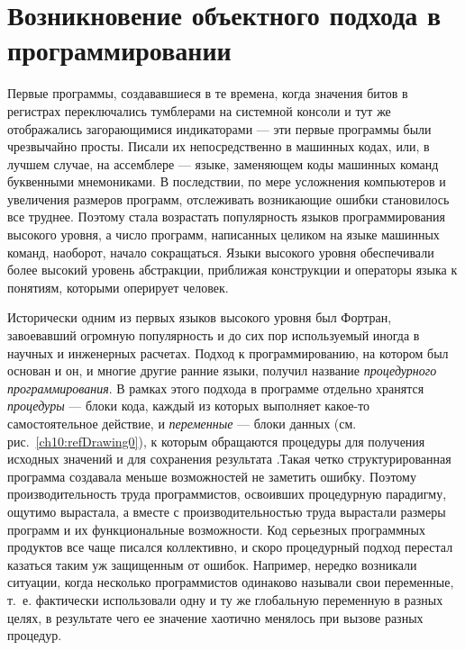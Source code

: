 \renewcommand{\arraystretch}{0.5}
\chapter[Возникновение объектного подхода в программировании]{Возникновение объектного подхода в программировании}
Первые программы, создававшиеся в те времена, когда значения битов в регистрах переключались тумблерами на системной
консоли и тут же отображались загорающимися индикаторами --- эти первые программы были чрезвычайно просты. Писали их
непосредственно в машинных кодах, или, в лучшем случае, на ассемблере --- языке, заменяющем коды машинных команд
буквенными мнемониками. В последствии, по мере усложнения компьютеров и увеличения размеров программ, отслеживать
возникающие ошибки становилось все труднее. Поэтому стала возрастать популярность языков программирования высокого
уровня, а число программ, написанных целиком на языке машинных команд, наоборот, начало сокращаться. Языки высокого
уровня обеспечивали более высокий уровень абстракции, приближая конструкции и операторы языка к понятиям, которыми
оперирует человек.

Исторически одним из первых языков высокого уровня был Фортран, завоевавший огромную популярность и до сих пор
используемый иногда в научных и инженерных расчетах. Подход к программированию, на котором был основан и он, и многие
другие ранние языки, получил название \emph{процедурного программирования}. В рамках этого подхода в
программе отдельно хранятся \emph{процедуры} --- блоки кода, каждый из которых выполняет какое-то
самостоятельное действие, и \emph{переменные} --- блоки данных (см. рис.~\ref{ch10:refDrawing0}), к которым
обращаются процедуры для получения исходных значений и для сохранения результата .Такая четко структурированная
программа создавала меньше возможностей не заметить ошибку. Поэтому производительность труда программистов, освоивших
процедурную парадигму, ощутимо вырастала, а вместе с производительностью труда вырастали размеры программ и их
функциональные возможности. Код серьезных программных продуктов все чаще писался коллективно, и скоро процедурный
подход перестал казаться таким уж защищенным от ошибок. Например, нередко возникали ситуации, когда несколько
программистов одинаково называли свои переменные, т.~е. фактически использовали одну и ту же глобальную переменную в
разных целях, в результате чего ее значение хаотично менялось при вызове разных процедур. 

